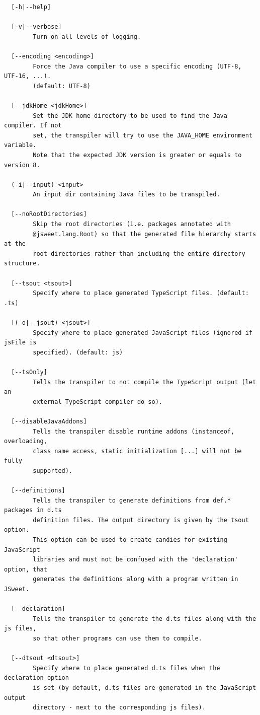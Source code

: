 \documentclass[a4paper]{report}
\begin{document}
\begin{small}
\begin{verbatim}
  [-h|--help]

  [-v|--verbose]
        Turn on all levels of logging.

  [--encoding <encoding>]
        Force the Java compiler to use a specific encoding (UTF-8, UTF-16, ...).
        (default: UTF-8)

  [--jdkHome <jdkHome>]
        Set the JDK home directory to be used to find the Java compiler. If not
        set, the transpiler will try to use the JAVA_HOME environment variable.
        Note that the expected JDK version is greater or equals to version 8.

  (-i|--input) <input>
        An input dir containing Java files to be transpiled.

  [--noRootDirectories]
        Skip the root directories (i.e. packages annotated with
        @jsweet.lang.Root) so that the generated file hierarchy starts at the
        root directories rather than including the entire directory structure.

  [--tsout <tsout>]
        Specify where to place generated TypeScript files. (default: .ts)

  [(-o|--jsout) <jsout>]
        Specify where to place generated JavaScript files (ignored if jsFile is
        specified). (default: js)

  [--tsOnly]
        Tells the transpiler to not compile the TypeScript output (let an
        external TypeScript compiler do so).

  [--disableJavaAddons]
        Tells the transpiler disable runtime addons (instanceof, overloading,
        class name access, static initialization [...] will not be fully
        supported).

  [--definitions]
        Tells the transpiler to generate definitions from def.* packages in d.ts
        definition files. The output directory is given by the tsout option.
        This option can be used to create candies for existing JavaScript
        libraries and must not be confused with the 'declaration' option, that
        generates the definitions along with a program written in JSweet.

  [--declaration]
        Tells the transpiler to generate the d.ts files along with the js files,
        so that other programs can use them to compile.

  [--dtsout <dtsout>]
        Specify where to place generated d.ts files when the declaration option
        is set (by default, d.ts files are generated in the JavaScript output
        directory - next to the corresponding js files).


\end{verbatim}
\end{small}
\end{document}
